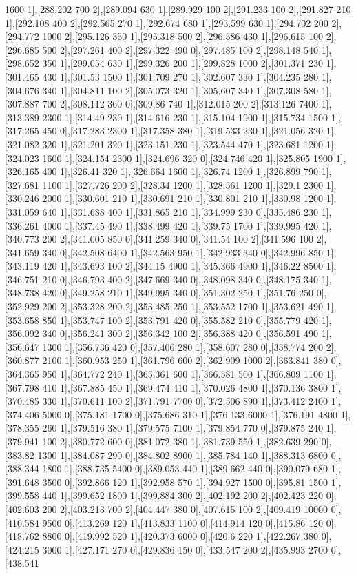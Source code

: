 {1600 1],[288.202 700 2],[289.094 630 1],[289.929 100 2],[291.233 100 2],[291.827 210 1],[292.108 400 2],[292.565 270 1],[292.674 680 1],[293.599 630 1],[294.702 200 2],[294.772 1000 2],[295.126 350 1],[295.318 500 2],[296.586 430 1],[296.615 100 2],[296.685 500 2],[297.261 400 2],[297.322 490 0],[297.485 100 2],[298.148 540 1],[298.652 350 1],[299.054 630 1],[299.326 200 1],[299.828 1000 2],[301.371 230 1],[301.465 430 1],[301.53 1500 1],[301.709 270 1],[302.607 330 1],[304.235 280 1],[304.676 340 1],[304.811 100 2],[305.073 320 1],[305.607 340 1],[307.308 580 1],[307.887 700 2],[308.112 360 0],[309.86 740 1],[312.015 200 2],[313.126 7400 1],[313.389 2300 1],[314.49 230 1],[314.616 230 1],[315.104 1900 1],[315.734 1500 1],[317.265 450 0],[317.283 2300 1],[317.358 380 1],[319.533 230 1],[321.056 320 1],[321.082 320 1],[321.201 320 1],[323.151 230 1],[323.544 470 1],[323.681 1200 1],[324.023 1600 1],[324.154 2300 1],[324.696 320 0],[324.746 420 1],[325.805 1900 1],[326.165 400 1],[326.41 320 1],[326.664 1600 1],[326.74 1200 1],[326.899 790 1],[327.681 1100 1],[327.726 200 2],[328.34 1200 1],[328.561 1200 1],[329.1 2300 1],[330.246 2000 1],[330.601 210 1],[330.691 210 1],[330.801 210 1],[330.98 1200 1],[331.059 640 1],[331.688 400 1],[331.865 210 1],[334.999 230 0],[335.486 230 1],[336.261 4000 1],[337.45 490 1],[338.499 420 1],[339.75 1700 1],[339.995 420 1],[340.773 200 2],[341.005 850 0],[341.259 340 0],[341.54 100 2],[341.596 100 2],[341.659 340 0],[342.508 6400 1],[342.563 950 1],[342.933 340 0],[342.996 850 1],[343.119 420 1],[343.693 100 2],[344.15 4900 1],[345.366 4900 1],[346.22 8500 1],[346.751 210 0],[346.793 400 2],[347.669 340 0],[348.098 340 0],[348.175 340 1],[348.738 420 0],[349.258 210 1],[349.995 340 0],[351.302 250 1],[351.76 250 0],[352.929 200 2],[353.328 200 2],[353.485 250 1],[353.552 1700 1],[353.621 490 1],[353.658 850 1],[353.747 100 2],[353.791 420 0],[355.582 210 0],[355.779 420 1],[356.092 340 0],[356.241 300 2],[356.342 100 2],[356.388 420 0],[356.591 490 1],[356.647 1300 1],[356.736 420 0],[357.406 280 1],[358.607 280 0],[358.774 200 2],[360.877 2100 1],[360.953 250 1],[361.796 600 2],[362.909 1000 2],[363.841 380 0],[364.365 950 1],[364.772 240 1],[365.361 600 1],[366.581 500 1],[366.809 1100 1],[367.798 410 1],[367.885 450 1],[369.474 410 1],[370.026 4800 1],[370.136 3800 1],[370.485 330 1],[370.611 100 2],[371.791 7700 0],[372.506 890 1],[373.412 2400 1],[374.406 5000 0],[375.181 1700 0],[375.686 310 1],[376.133 6000 1],[376.191 4800 1],[378.355 260 1],[379.516 380 1],[379.575 7100 1],[379.854 770 0],[379.875 240 1],[379.941 100 2],[380.772 600 0],[381.072 380 1],[381.739 550 1],[382.639 290 0],[383.82 1300 1],[384.087 290 0],[384.802 8900 1],[385.784 140 1],[388.313 6800 0],[388.344 1800 1],[388.735 5400 0],[389.053 440 1],[389.662 440 0],[390.079 680 1],[391.648 3500 0],[392.866 120 1],[392.958 570 1],[394.927 1500 0],[395.81 1500 1],[399.558 440 1],[399.652 1800 1],[399.884 300 2],[402.192 200 2],[402.423 220 0],[402.603 200 2],[403.213 700 2],[404.447 380 0],[407.615 100 2],[409.419 10000 0],[410.584 9500 0],[413.269 120 1],[413.833 1100 0],[414.914 120 0],[415.86 120 0],[418.762 8800 0],[419.992 520 1],[420.373 6000 0],[420.6 220 1],[422.267 380 0],[424.215 3000 1],[427.171 270 0],[429.836 150 0],[433.547 200 2],[435.993 2700 0],[438.541 }
